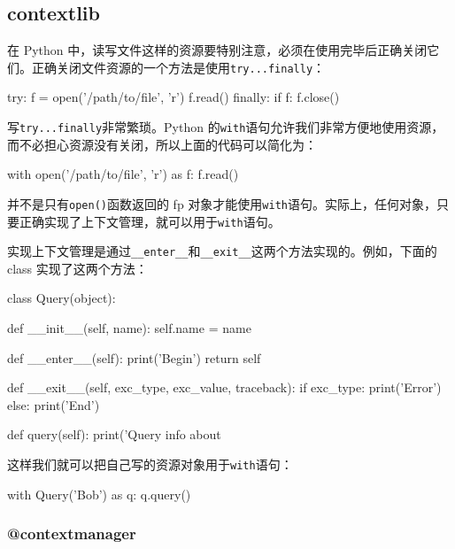 \hypertarget{contextlib}{%
\subsection{contextlib}\label{contextlib}}

在 Python
中，读写文件这样的资源要特别注意，必须在使用完毕后正确关闭它们。正确关闭文件资源的一个方法是使用\texttt{try...finally}：

\begin{pythoncode}
try:
    f = open('/path/to/file', 'r')
    f.read()
finally:
    if f:
        f.close()
\end{pythoncode}

写\texttt{try...finally}非常繁琐。Python
的\texttt{with}语句允许我们非常方便地使用资源，而不必担心资源没有关闭，所以上面的代码可以简化为：

\begin{pythoncode}
with open('/path/to/file', 'r') as f:
    f.read()
\end{pythoncode}

并不是只有\texttt{open()}函数返回的 fp
对象才能使用\texttt{with}语句。实际上，任何对象，只要正确实现了上下文管理，就可以用于\texttt{with}语句。

实现上下文管理是通过\texttt{\_\_enter\_\_}和\texttt{\_\_exit\_\_}这两个方法实现的。例如，下面的
class 实现了这两个方法：

\begin{pythoncode}
class Query(object):

    def __init__(self, name):
        self.name = name

    def __enter__(self):
        print('Begin')
        return self
    
    def __exit__(self, exc_type, exc_value, traceback):
        if exc_type:
            print('Error')
        else:
            print('End')
    
    def query(self):
        print('Query info about %
\end{pythoncode}

这样我们就可以把自己写的资源对象用于\texttt{with}语句：

\begin{pythoncode}
with Query('Bob') as q:
    q.query()
\end{pythoncode}

\hypertarget{contextmanager}{%
\subsubsection{@contextmanager}\label{contextmanager}}

